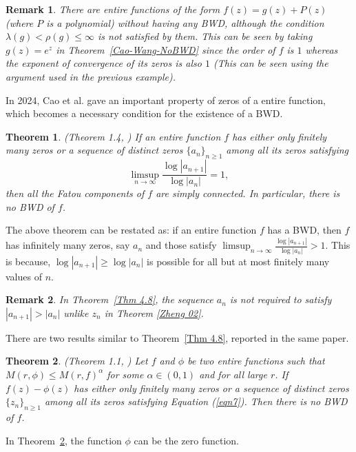 \documentclass[11pt,a4paper]{article}
\newtheorem{theorem}{Theorem}[section]
\newtheorem{Remark}{Remark}[section]
\begin{document}
	\begin{Remark}
	There are entire functions of the form $f(z)=g(z)+P(z)$ (where $P$ is a polynomial) without having any BWD, although the condition $\lambda(g)<\rho(g)\leq\infty$ is not satisfied by them. This can be seen 	by taking $g(z)=e^z$ in Theorem~\ref{Cao-Wang-NoBWD} since  the order of $f$ is $1$ whereas the exponent of convergence of its zeros is also $1$ (This can be seen using the argument used in the previous example).
		\end{Remark}
In 2024,  Cao et al.  gave an important property of zeros of a  entire function, which becomes a necessary condition for the existence of a BWD.
	
	\begin{theorem}(Theorem 1.4, \cite{CaoWangZhao 2024}\label{Thm36})\label{Thm 4.8}
	 If an entire function $f$ has either only finitely many zeros or a sequence of distinct zeros $\{a_n\}_{n\geq 1}$ among all its zeros satisfying
		\begin{equation}\label{eqn7}
			\limsup_{n\to\infty}\frac{\log|a_{n+1}|}{\log|a_n|}=1,
		\end{equation}
		then all the Fatou components of $f$ are simply connected. In particular, there is no BWD of $f$.
	\end{theorem}
The above theorem can be restated as: if an entire function $f$ has a BWD, then $f$ has infinitely many zeros, say $a_n$ and those satisfy $\limsup_{n\to\infty}\frac{\log|a_{n+1}|}{\log|a_n|}>1$. This is because, $ \log|a_{n+1}| \geq  \log|a_n|$ is possible for all but at most  finitely many values of $n$.
 
 	
	\begin{Remark}
		In Theorem~\ref{Thm 4.8}, the sequence $a_n$ is not required to satisfy $|a_{n+1}|>|a_n|$ unlike $z_n$ in Theorem \ref{Zheng 02}.  
	\end{Remark}
	There are two  results similar to Theorem~\ref{Thm 4.8}, reported in the same paper.
	\begin{theorem}(Theorem 1.1, \cite{CaoWangZhao 2024})
		Let $f$ and $\phi$ be two entire functions such that $M(r,\phi)\leq M(r, f)^\alpha$ for some $\alpha\in(0,1)$ and for all large $r$. If $f(z)-\phi(z)$ has either only finitely many zeros or a sequence of distinct zeros $\{z_n\}_{n\geq 1}$ among all its zeros satisfying Equation (\ref{eqn7}). Then there is no BWD of $f$.
		\label{CW2024}
	\end{theorem}
	
	In Theorem~\ref{CW2024}, the function $\phi$ can be the zero function.
 
\end{document}
